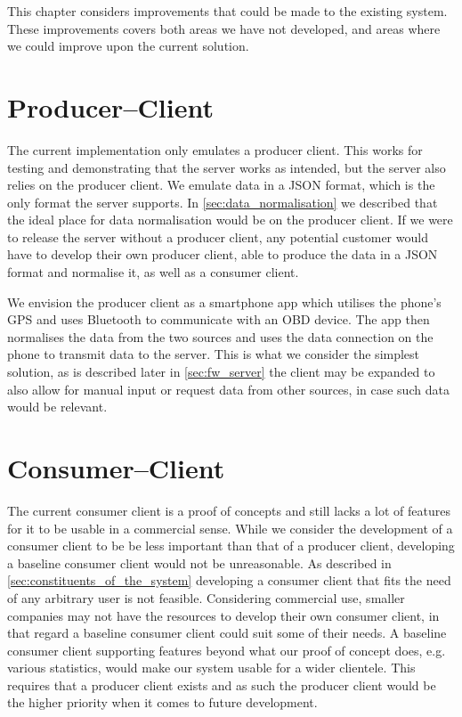 This chapter considers improvements that could be made to the existing system.
These improvements covers both areas we have not developed, and areas where we could improve upon the current solution.
\section{Producer--Client}
The current implementation only emulates a producer client.
This works for testing and demonstrating that the server works as intended, but the server also relies on the producer client.
We emulate data in a JSON format, which is the only format the server supports.
In \cref{sec:data_normalisation} we described that the ideal place for data normalisation would be on the producer client.
If we were to release the server without a producer client, any potential customer would have to develop their own producer client, able to produce the data in a JSON format and normalise it, as well as a consumer client.

\bigskip
We envision the producer client as a smartphone app which utilises the phone's GPS and uses Bluetooth to communicate with an \ac{OBD} device.
The app then normalises the data from the two sources and uses the data connection on the phone to transmit data to the server.
This is what we consider the simplest solution, as is described later in \cref{sec:fw_server} the client may be expanded to also allow for manual input or request data from other sources, in case such data would be relevant.
\section{Consumer--Client}
The current consumer client is a proof of concepts and still lacks a lot of features for it to be usable in a commercial sense.
While we consider the development of a consumer client to be be less important than that of a producer client, developing a baseline consumer client would not be unreasonable.
As described in \cref{sec:constituents_of_the_system} developing a consumer client that fits the need of any arbitrary user is not feasible.
Considering commercial use, smaller companies may not have the resources to develop their own consumer client, in that regard a baseline consumer client could suit some of their needs.
A baseline consumer client supporting features beyond what our proof of concept does, e.g. various statistics, would make our system usable for a wider clientele.
This requires that a producer client exists and as such the producer client would be the higher priority when it comes to future development.
